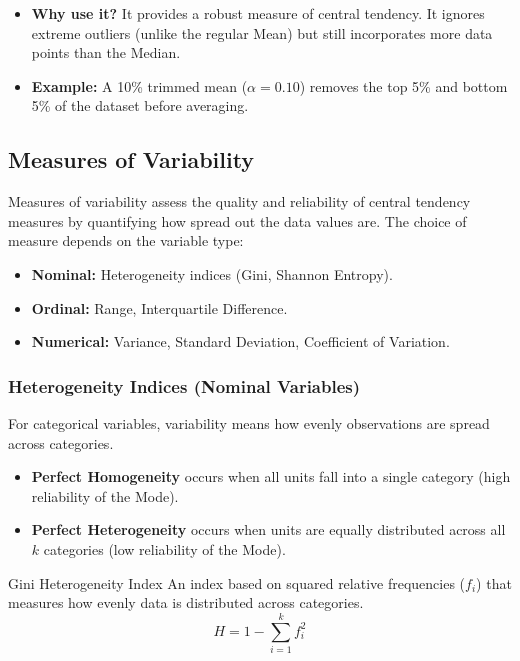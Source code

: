 \begin{itemize}
    \item \textbf{Why use it?} It provides a robust measure of central tendency. It ignores extreme outliers (unlike the regular Mean) but still incorporates more data points than the Median.
    \item \textbf{Example:} A 10\% trimmed mean ($\alpha=0.10$) removes the top 5\% and bottom 5\% of the dataset before averaging.
\end{itemize}

\subsection{Measures of Variability}

Measures of variability assess the quality and reliability of central tendency measures by quantifying how spread out the data values are. The choice of measure depends on the variable type:
\begin{itemize}
    \item \textbf{Nominal:} Heterogeneity indices (Gini, Shannon Entropy).
    \item \textbf{Ordinal:} Range, Interquartile Difference.
    \item \textbf{Numerical:} Variance, Standard Deviation, Coefficient of Variation.
\end{itemize}

\subsubsection{Heterogeneity Indices (Nominal Variables)}

For categorical variables, variability means how evenly observations are spread across categories. 
\begin{itemize}
  \item \textbf{Perfect Homogeneity} occurs when all units fall into a single category (high reliability of the Mode).

\item \textbf{Perfect Heterogeneity} occurs when units are equally distributed across all $k$ categories (low reliability of the Mode).
\end{itemize}

\pagebreak

\begin{defbox}{Gini Heterogeneity Index}
An index based on squared relative frequencies ($f_i$) that measures how evenly data is distributed across categories.
\begin{equation}
    H = 1 - \sum_{i=1}^{k} f_i^2
\end{equation}

\end{defbox}

